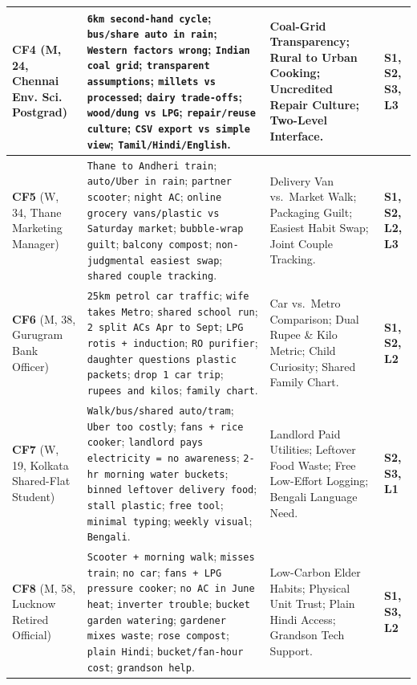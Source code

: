 \documentclass[12pt, a4paper]{article}
\begin{document}
{\begin{longtable}{|>{\raggedright\arraybackslash}p{3.0cm}|>{\raggedright\arraybackslash}p{7.1cm}|>{\raggedright\arraybackslash}p{3.7cm}|>{\raggedright\arraybackslash}p{1.9cm}|}
\textbf{CF4} \cite{cf4} (M, 24, Chennai Env. Sci. Postgrad) & 
\texttt{6km second-hand cycle}; \texttt{bus/share auto in rain}; \texttt{Western factors wrong}; \texttt{Indian coal grid}; \texttt{transparent assumptions}; \texttt{millets vs processed}; \texttt{dairy trade-offs}; \texttt{wood/dung vs LPG}; \texttt{repair/reuse culture}; \texttt{CSV export vs simple view}; \texttt{Tamil/Hindi/English}. & 
Coal-Grid Transparency; Rural to Urban Cooking; Uncredited Repair Culture; Two-Level Interface. & 
\textbf{S1, S2, S3, L3} \\
\hline

\textbf{CF5} \cite{cf5} (W, 34, Thane Marketing Manager) & 
\texttt{Thane to Andheri train}; \texttt{auto/Uber in rain}; \texttt{partner scooter}; \texttt{night AC}; \texttt{online grocery vans/plastic vs Saturday market}; \texttt{bubble-wrap guilt}; \texttt{balcony compost}; \texttt{non-judgmental easiest swap}; \texttt{shared couple tracking}. & 
Delivery Van vs.\ Market Walk; Packaging Guilt; Easiest Habit Swap; Joint Couple Tracking. & 
\textbf{S1, S2, L2, L3} \\
\hline

\textbf{CF6} \cite{cf6} (M, 38, Gurugram Bank Officer) & 
\texttt{25km petrol car traffic}; \texttt{wife takes Metro}; \texttt{shared school run}; \texttt{2 split ACs Apr to Sept}; \texttt{LPG rotis + induction}; \texttt{RO purifier}; \texttt{daughter questions plastic packets}; \texttt{drop 1 car trip}; \texttt{rupees and kilos}; \texttt{family chart}. & 
Car vs.\ Metro Comparison; Dual Rupee \& Kilo Metric; Child Curiosity; Shared Family Chart. & 
\textbf{S1, S2, L2} \\
\hline

\textbf{CF7} \cite{cf7} (W, 19, Kolkata Shared-Flat Student) & 
\texttt{Walk/bus/shared auto/tram}; \texttt{Uber too costly}; \texttt{fans + rice cooker}; \texttt{landlord pays electricity = no awareness}; \texttt{2-hr morning water buckets}; \texttt{binned leftover delivery food}; \texttt{stall plastic}; \texttt{free tool}; \texttt{minimal typing}; \texttt{weekly visual}; \texttt{Bengali}. & 
Landlord Paid Utilities; Leftover Food Waste; Free Low-Effort Logging; Bengali Language Need. & 
\textbf{S2, S3, L1} \\
\hline

\textbf{CF8} \cite{cf8} (M, 58, Lucknow Retired Official) & 
\texttt{Scooter + morning walk}; \texttt{misses train}; \texttt{no car}; \texttt{fans + LPG pressure cooker}; \texttt{no AC in June heat}; \texttt{inverter trouble}; \texttt{bucket garden watering}; \texttt{gardener mixes waste}; \texttt{rose compost}; \texttt{plain Hindi}; \texttt{bucket/fan-hour cost}; \texttt{grandson help}. & 
Low-Carbon Elder Habits; Physical Unit Trust; Plain Hindi Access; Grandson Tech Support. & 
\textbf{S1, S3, L2} \\
\hline


\end{longtable}}
\end{document}
